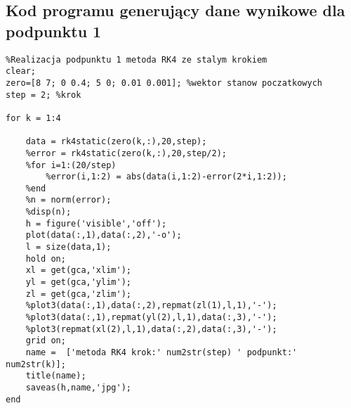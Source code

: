 \documentclass[a4paper, 11pt]{article}
\begin{document}
\subsection{Kod programu generujący dane wynikowe dla podpunktu 1}
\begin{lstlisting}
%Realizacja podpunktu 1 metoda RK4 ze stalym krokiem
clear; 
zero=[8 7; 0 0.4; 5 0; 0.01 0.001]; %wektor stanow poczatkowych
step = 2; %krok

for k = 1:4
    
    data = rk4static(zero(k,:),20,step);
    %error = rk4static(zero(k,:),20,step/2);
    %for i=1:(20/step)
        %error(i,1:2) = abs(data(i,1:2)-error(2*i,1:2));
    %end
    %n = norm(error);
    %disp(n); 
    h = figure('visible','off');
    plot(data(:,1),data(:,2),'-o');
    l = size(data,1);
    hold on;
    xl = get(gca,'xlim');
    yl = get(gca,'ylim');
    zl = get(gca,'zlim');
    %plot3(data(:,1),data(:,2),repmat(zl(1),l,1),'-');
    %plot3(data(:,1),repmat(yl(2),l,1),data(:,3),'-');
    %plot3(repmat(xl(2),l,1),data(:,2),data(:,3),'-');
    grid on;
    name =  ['metoda RK4 krok:' num2str(step) ' podpunkt:' num2str(k)]; 
    title(name);
    saveas(h,name,'jpg');
end
\end{lstlisting}
\end{document}
